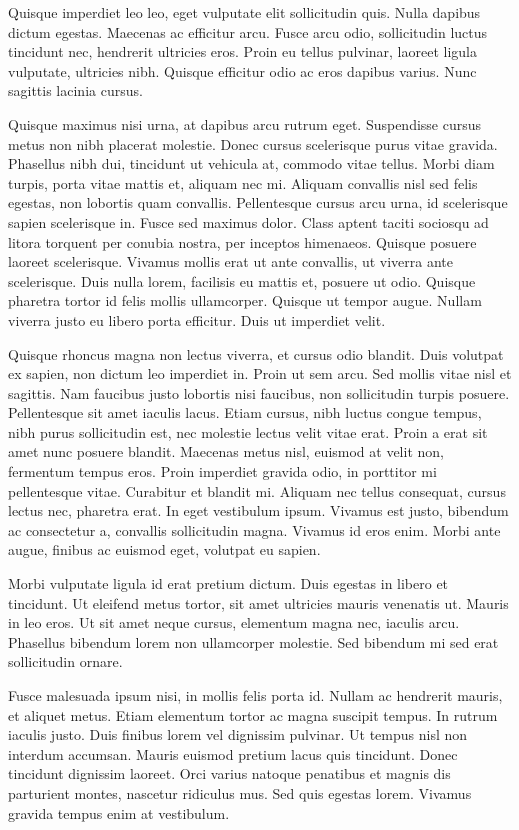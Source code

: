 \documentclass{novel}
\begin{document}
Quisque imperdiet leo leo, eget vulputate elit sollicitudin quis. Nulla dapibus dictum egestas. Maecenas ac efficitur arcu. Fusce arcu odio, sollicitudin luctus tincidunt nec, hendrerit ultricies eros. Proin eu tellus pulvinar, laoreet ligula vulputate, ultricies nibh. Quisque efficitur odio ac eros dapibus varius. Nunc sagittis lacinia cursus.

Quisque maximus nisi urna, at dapibus arcu rutrum eget. Suspendisse cursus metus non nibh placerat molestie. Donec cursus scelerisque purus vitae gravida. Phasellus nibh dui, tincidunt ut vehicula at, commodo vitae tellus. Morbi diam turpis, porta vitae mattis et, aliquam nec mi. Aliquam convallis nisl sed felis egestas, non lobortis quam convallis. Pellentesque cursus arcu urna, id scelerisque sapien scelerisque in. Fusce sed maximus dolor. Class aptent taciti sociosqu ad litora torquent per conubia nostra, per inceptos himenaeos. Quisque posuere laoreet scelerisque. Vivamus mollis erat ut ante convallis, ut viverra ante scelerisque. Duis nulla lorem, facilisis eu mattis et, posuere ut odio. Quisque pharetra tortor id felis mollis ullamcorper. Quisque ut tempor augue. Nullam viverra justo eu libero porta efficitur. Duis ut imperdiet velit.

Quisque rhoncus magna non lectus viverra, et cursus odio blandit. Duis volutpat ex sapien, non dictum leo imperdiet in. Proin ut sem arcu. Sed mollis vitae nisl et sagittis. Nam faucibus justo lobortis nisi faucibus, non sollicitudin turpis posuere. Pellentesque sit amet iaculis lacus. Etiam cursus, nibh luctus congue tempus, nibh purus sollicitudin est, nec molestie lectus velit vitae erat. Proin a erat sit amet nunc posuere blandit. Maecenas metus nisl, euismod at velit non, fermentum tempus eros. Proin imperdiet gravida odio, in porttitor mi pellentesque vitae. Curabitur et blandit mi. Aliquam nec tellus consequat, cursus lectus nec, pharetra erat. In eget vestibulum ipsum. Vivamus est justo, bibendum ac consectetur a, convallis sollicitudin magna. Vivamus id eros enim. Morbi ante augue, finibus ac euismod eget, volutpat eu sapien.

Morbi vulputate ligula id erat pretium dictum. Duis egestas in libero et tincidunt. Ut eleifend metus tortor, sit amet ultricies mauris venenatis ut. Mauris in leo eros. Ut sit amet neque cursus, elementum magna nec, iaculis arcu. Phasellus bibendum lorem non ullamcorper molestie. Sed bibendum mi sed erat sollicitudin ornare.

Fusce malesuada ipsum nisi, in mollis felis porta id. Nullam ac hendrerit mauris, et aliquet metus. Etiam elementum tortor ac magna suscipit tempus. In rutrum iaculis justo. Duis finibus lorem vel dignissim pulvinar. Ut tempus nisl non interdum accumsan. Mauris euismod pretium lacus quis tincidunt. Donec tincidunt dignissim laoreet. Orci varius natoque penatibus et magnis dis parturient montes, nascetur ridiculus mus. Sed quis egestas lorem. Vivamus gravida tempus enim at vestibulum.
\end{document}
